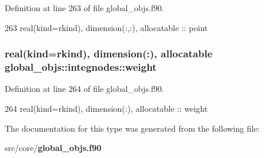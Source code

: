 Definition at line 263 of file global\+\_\+objs.\+f90.


\begin{DoxyCode}
263     \textcolor{keywordtype}{real(kind=rkind)}, \textcolor{keywordtype}{dimension(:,:)}, \textcolor{keywordtype}{allocatable} :: point
\end{DoxyCode}
\subsubsection[{weight}]{\setlength{\rightskip}{0pt plus 5cm}real(kind=rkind), dimension(\+:), allocatable global\+\_\+objs\+::integnodes\+::weight}\label{structglobal__objs_1_1integnodes_a268076d7f5db5c10dc3e45db8c862492}


Definition at line 264 of file global\+\_\+objs.\+f90.


\begin{DoxyCode}
264     \textcolor{keywordtype}{real(kind=rkind)}, \textcolor{keywordtype}{dimension(:)}, \textcolor{keywordtype}{allocatable}   :: weight
\end{DoxyCode}


The documentation for this type was generated from the following file\+:\begin{DoxyCompactItemize}
\item 
src/core/{\bf global\+\_\+objs.\+f90}\end{DoxyCompactItemize}
